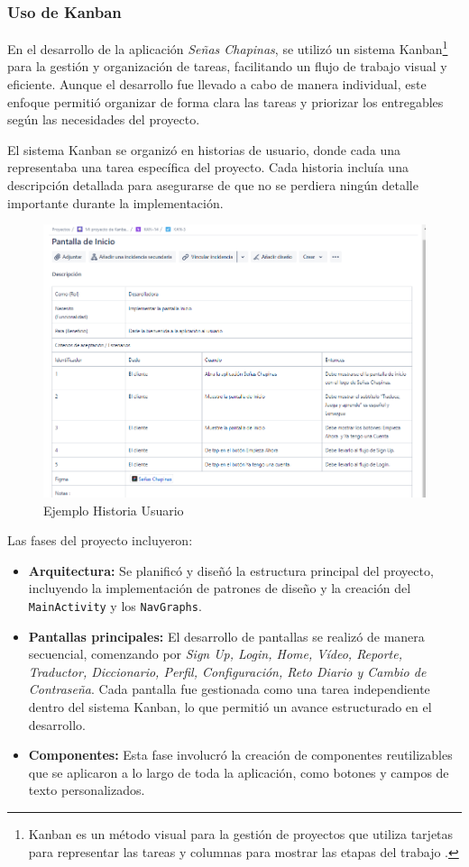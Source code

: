 
\subsubsection{Uso de Kanban}

En el desarrollo de la aplicación \textit{Señas Chapinas}, se utilizó un sistema Kanban\footnote{Kanban es un método visual para la gestión de proyectos que utiliza tarjetas para representar las tareas y columnas para mostrar las etapas del trabajo \cite{asana2024}.} para la gestión y organización de tareas, facilitando un flujo de trabajo visual y eficiente. Aunque el desarrollo fue llevado a cabo de manera individual, este enfoque permitió organizar de forma clara las tareas y priorizar los entregables según las necesidades del proyecto.

El sistema Kanban se organizó en historias de usuario, donde cada una representaba una tarea específica del proyecto. Cada historia incluía una descripción detallada para asegurarse de que no se perdiera ningún detalle importante durante la implementación.

\begin{figure}  [H]
    \centering
    \includegraphics[width=0.6\linewidth]{figuras/kabana_ejemplo.png}
    \caption{Ejemplo Historia Usuario}
    \label{fig:enter-label}
\end{figure}


Las fases del proyecto incluyeron:

\begin{itemize}
    \item \textbf{Arquitectura:} Se planificó y diseñó la estructura principal del proyecto, incluyendo la implementación de patrones de diseño y la creación del \texttt{MainActivity} y los \texttt{NavGraphs}.
    \item \textbf{Pantallas principales:} El desarrollo de pantallas se realizó de manera secuencial, comenzando por\textit{ Sign Up, Login, Home, Vídeo, Reporte, Traductor, Diccionario, Perfil, Configuración, Reto Diario y Cambio de Contraseña}. Cada pantalla fue gestionada como una tarea independiente dentro del sistema Kanban, lo que permitió un avance estructurado en el desarrollo.
    \item \textbf{Componentes:} Esta fase involucró la creación de componentes reutilizables que se aplicaron a lo largo de toda la aplicación, como botones y campos de texto personalizados.
\end{itemize}

